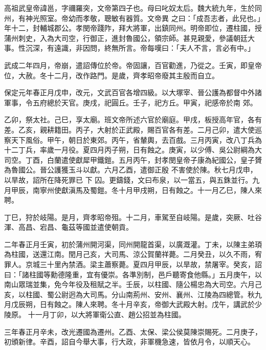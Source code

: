 
\begin{pinyinscope}

 高祖武皇帝諱邕，字禰羅突，文帝第四子也。母曰叱奴太后。魏大統九年，生於同州，有神光照室。帝幼而孝敬，聰敏有器質。文帝異
 之曰：「成吾志者，此兒也。」年十二，封輔城郡公。孝閔帝踐阼，拜大將軍，出鎮同州。明帝即位，遷柱國，授蒲州刺史，入為大司空，行御正，進封魯國公，領宗師。甚見親愛，參議朝廷大事。性沉深，有遠識，非因問，終無所言。帝每嘆曰：「夫人不言，言必有中。」



 武成二年四月，帝崩，遣詔傳位於帝。帝固讓，百官勸進，乃從之。壬寅，即皇帝位，大赦。冬十二月，改作路門。是歲，齊孝昭帝廢其主殷而自立。



 保定元年春正月戊申，改元，文武百官各增四級。以大塚宰、晉公護為都督中外諸軍事，令五府總於天官。庚戌，祀圓丘。壬子，祀方丘。甲寅，祀感帝於南
 郊。



 乙卯，祭太社。己巳，享太廟。班文帝所述六官於廟庭。甲戌，板授高年官，各有差。乙亥，親耕籍田。丙子，大射於正武殿，賜百官各有差。二月己卯，遣大使巡察天下風俗。甲午，朝日於東郊。丙午，省輦輿，去百戲。三月丙寅，改八丁兵為十二丁兵，率歲一月役。夏四月丙子朔，日有蝕之。庚寅，以少傅、吳公尉綱為大司空。丁酉，白蘭遣使獻犀甲鐵鎧。五月丙午，封孝閔皇帝子康為紀國公，皇子贇為魯國公。晉公護獲玉斗以獻。六月乙酉，遣御正殷
 不害使於陳。秋七月戊申，以旱故，詔所在降死罪已
 下
 囚。更鑄錢，文曰布泉，以一當五，與五銖並行。九月甲辰，南寧州使獻滇馬及蜀鎧。冬十月甲戌朔，日有蝕之。十一月乙巳，陳人來聘。



 丁巳，狩於岐陽。是月，齊孝昭帝殂。十二月，車駕至自岐陽。是歲，突厥、吐谷渾、高昌、宕昌、龜茲等國並遣使朝貢。



 二年春正月壬寅，初於蒲州開河渠，同州開龍首渠，以廣溉灌。丁未，以陳主弟頊為柱國，送還江南。閏月己亥，大司馬、涼公賀蘭祥薨。二月癸丑，以久不雨，宥罪人。京城三十里內禁酒。梁主蕭察薨。夏四月甲辰，以旱故，禁屠宰。癸亥，詔曰：「諸柱國等勳德隆重，宜有優崇。各準別制，邑戶聽寄食他縣。」五月庚午，以南山眾瑞並集，免今年役及租賦之半。壬辰，以柱國、隨公楊忠為大司空。六月己亥，以柱國、蜀公尉迥為大司馬。分山南荊州、安州、襄州、江陵為四總管。秋九月戊辰朔，日有蝕之。陳人來聘。冬十月辛亥，帝御大武殿大射。戊午，講武於少陵原。
 十一月丁卯，以大將軍衛公直、趙公招並為柱國。



 三年春正月辛未，改光遷國為遷州。乙酉、太保、梁公侯莫陳崇賜死。二月庚子，初頒新律。辛酉，詔自今舉大事，行大政，非軍機急速，皆依月令，以順天心。




\end{pinyinscope}
